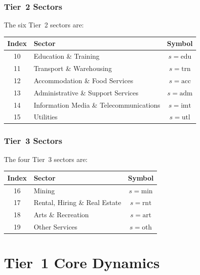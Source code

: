 \documentclass[11pt,a4paper]{article}
\begin{document}
\subsubsection*{Tier~2 Sectors}

The six Tier~2 sectors are:

\begin{center}
\begin{tabular}{clc}
\toprule
Index & Sector & Symbol \\
\midrule
10 & Education \& Training & $s = \text{edu}$ \\
11 & Transport \& Warehousing & $s = \text{trn}$ \\
12 & Accommodation \& Food Services & $s = \text{acc}$ \\
13 & Administrative \& Support Services & $s = \text{adm}$ \\
14 & Information Media \& Telecommunications & $s = \text{imt}$ \\
15 & Utilities & $s = \text{utl}$ \\
\bottomrule
\end{tabular}
\end{center}

\subsubsection*{Tier~3 Sectors}

The four Tier~3 sectors are:

\begin{center}
\begin{tabular}{clc}
\toprule
Index & Sector & Symbol \\
\midrule
16 & Mining & $s = \text{min}$ \\
17 & Rental, Hiring \& Real Estate & $s = \text{rnt}$ \\
18 & Arts \& Recreation & $s = \text{art}$ \\
19 & Other Services & $s = \text{oth}$ \\
\bottomrule
\end{tabular}
\end{center}

\section{Tier~1 Core Dynamics}
\label{sec:tier1}
\end{document}
